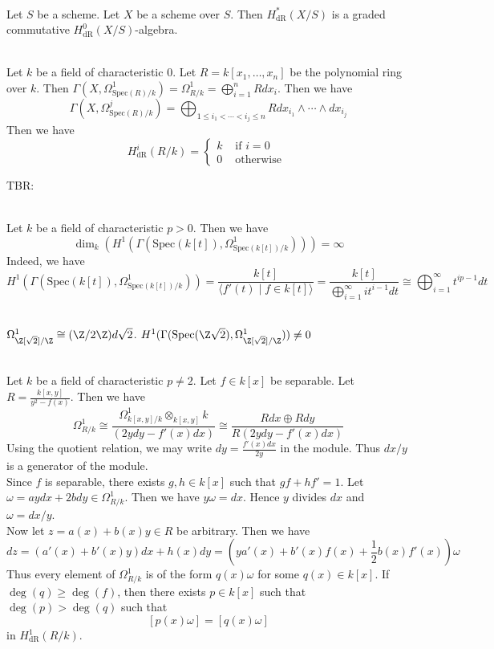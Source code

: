 \documentclass[a4paper]{article}
\begin{document}
\begin{lmm}{}{}\\
Let $S$ be a scheme. Let $X$ be a scheme over $S$. Then $H_\text{dR}^\ast(X/S)$ is a graded commutative $H_\text{dR}^0(X/S)$-algebra. 
\end{lmm}

\begin{eg}{}{}\\
Let $k$ be a field of characteristic $0$. Let $R=k[x_1,\dots,x_n]$ be the polynomial ring over $k$. Then $\Gamma\left(X,\Omega_{\text{Spec}(R)/k}^1\right)=\Omega_{R/k}^1=\bigoplus_{i=1}^nRdx_i$. Then we have $$\Gamma\left(X,\Omega_{\text{Spec}(R)/k}^j\right)=\bigoplus_{1\leq i_1<\cdots<i_j\leq n} Rdx_{i_1}\wedge\cdots\wedge dx_{i_j}$$ Then we have $$H_\text{dR}^i(R/k)=\begin{cases}
k & \text{ if }i=0\\
0 & \text{ otherwise }
\end{cases}$$
\end{eg}

TBR:

\begin{eg}{}{}\\
Let $k$ be a field of characteristic $p>0$. Then we have $$\dim_k(H^1(\Gamma(\text{Spec}(k[t]),\Omega_{\text{Spec}(k[t])/k}^1)))=\infty$$ Indeed, we have $$H^1(\Gamma(\text{Spec}(k[t]),\Omega_{\text{Spec}(k[t])/k}^1))=\frac{k[t]}{\langle f'(t)\;|\;f\in k[t]\rangle}=\frac{k[t]}{\bigoplus_{i=1}^\infty it^{i-1}dt}\cong\bigoplus_{i=1}^\infty t^{ip-1}dt$$
\end{eg}

\begin{eg}{}{}\\
$\Omega_{\Z[\sqrt{2}]/\Z}^1\cong(\Z/2\Z)d\sqrt{2}$. $H^1(\Gamma(\text{Spec}(\Z\sqrt{2}),\Omega_{\Z[\sqrt{2}]/\Z}^1))\neq0$
\end{eg}

\begin{eg}{}{}\\
Let $k$ be a field of characteristic $p\neq 2$. Let $f\in k[x]$ be separable. Let $R=\frac{k[x,y]}{y^2-f(x)}$. Then we have $$\Omega_{R/k}^1\cong\frac{\Omega_{k[x,y]/k}^1\otimes_{k[x,y]}k}{(2ydy-f'(x)dx)}\cong\frac{Rdx\oplus Rdy}{R(2ydy-f'(x)dx)}$$ Using the quotient relation, we may write $dy=\frac{f'(x)dx}{2y}$ in the module. Thus $dx/y$ is a generator of the module. \\

Since $f$ is separable, there exists $g,h\in k[x]$ such that $gf+hf'=1$. Let $\omega=aydx+2bdy\in\Omega_{R/k}^1$. Then we have $y\omega=dx$. Hence $y$ divides $dx$ and $\omega=dx/y$. \\

Now let $z=a(x)+b(x)y\in R$ be arbitrary. Then we have $$dz=(a'(x)+b'(x)y)dx+h(x)dy=(ya'(x)+b'(x)f(x)+\frac{1}{2}b(x)f'(x))\omega$$ Thus every element of $\Omega_{R/k}^1$ is of the form $q(x)\omega$ for some $q(x)\in k[x]$. If $\deg(q)\geq\deg(f)$, then there exists $p\in k[x]$ such that $\deg(p)>\deg(q)$ such that $$[p(x)\omega]=[q(x)\omega]$$ in $H_\text{dR}^1(R/k)$. 
\end{eg}
\end{document}
